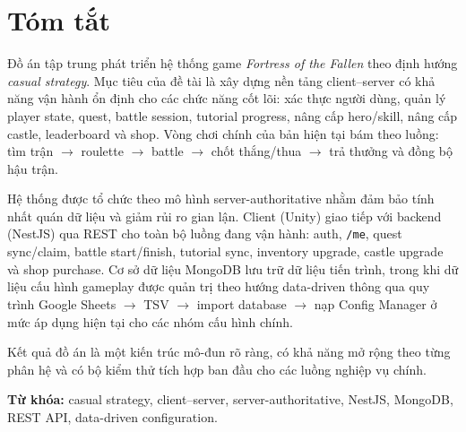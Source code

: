 ﻿%
\section*{Tóm tắt}

Đồ án tập trung phát triển hệ thống game \textit{Fortress of the Fallen} theo định hướng \textit{casual strategy}. Mục tiêu của đề tài là xây dựng nền tảng client--server có khả năng vận hành ổn định cho các chức năng cốt lõi: xác thực người dùng, quản lý player state, quest, battle session, tutorial progress, nâng cấp hero/\allowbreak skill, nâng cấp castle, leaderboard và shop. Vòng chơi chính của bản hiện tại bám theo luồng: tìm trận $\rightarrow$ roulette $\rightarrow$ battle $\rightarrow$ chốt thắng/\allowbreak thua $\rightarrow$ trả thưởng và đồng bộ hậu trận.

Hệ thống được tổ chức theo mô hình server-authoritative nhằm đảm bảo tính nhất quán dữ liệu và giảm rủi ro gian lận. Client (Unity) giao tiếp với backend (NestJS) qua REST cho toàn bộ luồng đang vận hành: auth, \texttt{/me}, quest sync/\allowbreak claim, battle start/\allowbreak finish, tutorial sync, inventory upgrade, castle upgrade và shop purchase. Cơ sở dữ liệu MongoDB lưu trữ dữ liệu tiến trình, trong khi dữ liệu cấu hình gameplay được quản trị theo hướng data-driven thông qua quy trình Google Sheets $\rightarrow$ TSV $\rightarrow$ import database $\rightarrow$ nạp Config Manager ở mức áp dụng hiện tại cho các nhóm cấu hình chính.

Kết quả đồ án là một kiến trúc mô-đun rõ ràng, có khả năng mở rộng theo từng phân hệ và có bộ kiểm thử tích hợp ban đầu cho các luồng nghiệp vụ chính.

\vspace{0.3cm}
\noindent\textbf{Từ khóa:} casual strategy, client--server, server-authoritative, NestJS, MongoDB, REST API, data-driven configuration.

